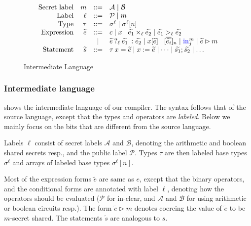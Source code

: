\begin{figure}
  \small
  \[
  \begin{array}{rrcl}
    \ftext{Secret label} & m &::=& \mathcal{A} \mid \mathcal{B}\\
    \ftext{Label} & \ell &::=& \mathcal{P} \mid m\\
    \ftext{Type} & \tau &::=& \sigma^{\ell} \mid \sigma^{\ell}[n]\\
    \ftext{Expression} & \widetilde{e} &::=& c \mid x \mid \widetilde{e_{1}} \mulop_{\ell} \widetilde{e_{2}} \mid \widetilde{e_{1}} >_{\ell} \widetilde{e_{2}} \\
    & & \mid & \lcond{\ell}{{\widetilde{e}}}{{\widetilde{e_{1}}}}{{\widetilde{e_{2}}}} \mid x[\widetilde{e}] \mid [\overline{\widetilde{e_{i}}}]_{n} \mid \kw{in}^{m}_{j} \mid \widetilde{e} \rhd m\\
    \ftext{Statement} & \widetilde{s} &::=& \tau\:x = \widetilde{e} \mid x := \widetilde{e} \mid \dots \mid \widetilde{s_{1}}; \widetilde{s_{2}} \mid \dots\\
  \end{array}
  \]
\caption{Intermediate Language}
\label{fig:interlang}
\end{figure}









\subsubsection*{Intermediate language}  shows the
intermediate language of our compiler. The syntax follows that of the source
language, except that the types and operators are \emph{labeled}. Below
we mainly focus on the bits that are different from the source
language.

Labels $\ell$ consist of secret labels $\mathcal{A}$ and
$\mathcal{B}$, denoting the arithmetic and boolean shared secrets
resp., and the public label $\mathcal{P}$. Types $\tau$ are then
labeled base types $\sigma^{\ell}$ and arrays of labeled base types
$\sigma^{\ell}[n]$.

Most of the expression forms $\widetilde{e}$ are same as $e$, except
that the binary operators, and the conditional forms
are annotated with label $\ell$, denoting how the operators should be
evaluated ($\mathcal{P}$ for in-clear, and $\mathcal{A}$ and
$\mathcal{B}$ for using arithmetic or boolean circuits resp.). The
form $\widetilde{e} \rhd m$ denotes coercing the value of $\widetilde{e}$ to be
$m$-secret shared. The statements $\widetilde{s}$ are analogous to
$s$.



